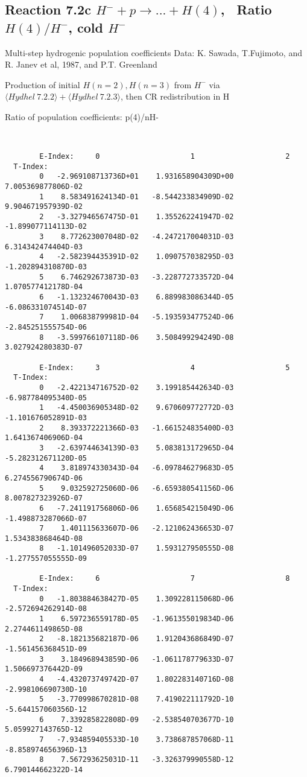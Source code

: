 \documentclass[12pt,dvipdfmx]{article}
\begin{document}
\subsection{
Reaction 7.2c $ H^- + p \rightarrow ...+ H(4) $, \   Ratio $H(4)/H^- $, cold $H^-$
}

 Multi-step hydrogenic population coefficients
 Data: K. Sawada, T.Fujimoto, \cite{kn:Sawada} and R. Janev et al, 1987, and P.T. Greenland

Production of initial $H(n=2), H(n=3)$ from $H^-$ via $ \langle Hydhel~ 7.2.2\rangle + \langle Hydhel~ 7.2.3\rangle$,
 then CR redistribution in H

 Ratio of population coefficients: p(4)/nH-

\begin{small}\begin{verbatim}


        E-Index:     0                     1                     2
  T-Index:
        0   -2.969108713736D+01    1.931658904309D+00    7.005369877806D-02
        1    8.583491624134D-01   -8.544233834909D-02    9.904671957939D-02
        2   -3.327946567475D-01    1.355262241947D-02   -1.899077114113D-02
        3    8.772623007048D-02   -4.247217004031D-03    6.314342474404D-03
        4   -2.582394435391D-02    1.090757038295D-03   -1.202894310870D-03
        5    6.746292673873D-03   -3.228772733572D-04    1.070577412178D-04
        6   -1.132324670043D-03    6.889983086344D-05   -6.086331074514D-07
        7    1.006838799981D-04   -5.193593477524D-06   -2.845251555754D-06
        8   -3.599766107118D-06    3.508499294249D-08    3.027924280383D-07

        E-Index:     3                     4                     5
  T-Index:
        0   -2.422134716752D-02    3.199185442634D-03   -6.987784095340D-05
        1   -4.450036905348D-02    9.670609772772D-03   -1.101676052891D-03
        2    8.393372221366D-03   -1.661524835400D-03    1.641367406906D-04
        3   -2.639744634139D-03    5.083813172965D-04   -5.282312671120D-05
        4    3.818974330343D-04   -6.097846279683D-05    6.274556790674D-06
        5    9.032592725060D-06   -6.659380541156D-06    8.007827323926D-07
        6   -7.241191756806D-06    1.656854215049D-06   -1.498873287066D-07
        7    1.401115633607D-06   -2.121062436653D-07    1.534383868464D-08
        8   -1.101496052033D-07    1.593127950555D-08   -1.277557055555D-09

        E-Index:     6                     7                     8
  T-Index:
        0   -1.803884638427D-05    1.309228115068D-06   -2.572694262914D-08
        1    6.597236559178D-05   -1.961355019834D-06    2.274461149865D-08
        2   -8.182135682187D-06    1.912043686849D-07   -1.561456368451D-09
        3    3.184968943859D-06   -1.061178779633D-07    1.506697376442D-09
        4   -4.432073749742D-07    1.802283140716D-08   -2.998106690730D-10
        5   -3.770998670281D-08    7.419022111792D-10   -5.644157060356D-12
        6    7.339285822808D-09   -2.538540703677D-10    5.059927143765D-12
        7   -7.934859405533D-10    3.738687857068D-11   -8.858974656396D-13
        8    7.567293625031D-11   -3.326379990558D-12    6.790144662322D-14


\end{verbatim}
\end{small}
\end{document}
